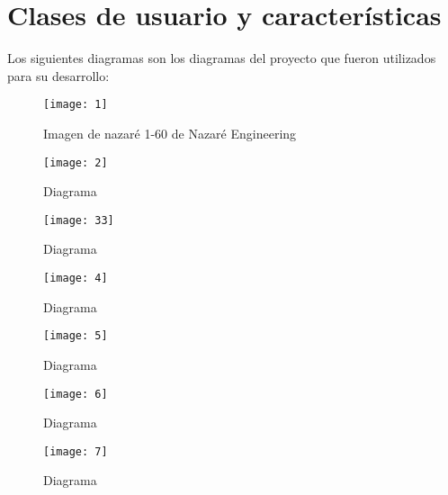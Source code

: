 \documentclass{scrreprt}
\begin{document}
		\section{Clases de usuario y características}
		Los siguientes diagramas son los diagramas del proyecto que fueron utilizados para su desarrollo:\\
		\begin{figure}[htbp]
			\begin{center}
				\texttt{[image: 1]}
				\caption{Imagen de nazaré 1-60 de Nazaré Engineering}
				\label{referencia}
			\end{center}
		\end{figure}

		\begin{figure}[htbp]
			\begin{center}
				\texttt{[image: 2]}
				\caption{Diagrama}
				\label{referencia}
			\end{center}
		\end{figure}

		\begin{figure}[htbp]
			\begin{center}
				\texttt{[image: 33]}
				\caption{Diagrama}
				\label{referencia}
			\end{center}
		\end{figure}

		\begin{figure}[htbp]
			\begin{center}
				\texttt{[image: 4]}
				\caption{Diagrama}
				\label{referencia}
			\end{center}
		\end{figure}

		\begin{figure}[htbp]
			\begin{center}
				\texttt{[image: 5]}
				\caption{Diagrama}
				\label{referencia}
			\end{center}
		\end{figure}

		\begin{figure}[htbp]
			\begin{center}
				\texttt{[image: 6]}
				\caption{Diagrama}
				\label{referencia}
			\end{center}
		\end{figure}

		\begin{figure}[htbp]
			\begin{center}
				\texttt{[image: 7]}
				\caption{Diagrama}
				\label{referencia}
			\end{center}
		\end{figure}
\end{document}

